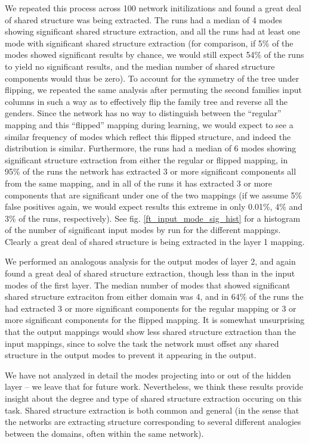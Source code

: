\documentclass[10pt,letterpaper]{article}
\begin{document}
We repeated this process across 100 network initilizations and found a great deal of shared structure was being extracted. The runs had a median of 4 modes showing significant shared structure extraction, and all the runs had at least one mode with significant shared structure extraction (for comparison, if 5\% of the modes showed significant results by chance, we would still expect 54\% of the runs to yield no significant results, and the median number of shared structure components would thus be zero). To account for the symmetry of the tree under flipping, we repeated the same analysis after permuting the second families input columns in such a way as to effectively flip the family tree and reverse all the genders. Since the network has no way to distinguish between the ``regular'' mapping and this ``flipped'' mapping during learning, we would expect to see a similar frequency of modes which reflect this flipped structure, and indeed the distribution is similar. Furthermore, the runs had a median of 6 modes showing significant structure extraction from either the regular or flipped mapping, in 95\% of the runs the network has extracted 3 or more significant components all from the same mapping, and in all of the runs it has extracted 3 or more components that are significant under one of the two mappings (if we assume 5\% false positives again, we would expect results this extreme in only 0.01\%, 4\% and 3\% of the runs, respectively). See fig. \ref{ft_input_mode_sig_hist} for a histogram of the number of significant input modes by run for the different mappings. Clearly a great deal of shared structure is being extracted in the layer 1 mapping. \par
We performed an analogous analysis for the output modes of layer 2, and again found a great deal of shared structure extraction, though less than in the input modes of the first layer. The median number of modes that showed significant shared structure extraciton from either domain was 4, and in 64\% of the runs the had extracted 3 or more significant components for the regular mapping or 3 or more significant components for the flipped mapping. It is somewhat unsurprising that the output mappings would show less shared structure extraction than the input mappings, since to solve the task the network must offset any shared structure in the output modes to prevent it appearing in the output. \par  
We have not analyzed in detail the modes projecting into or out of the hidden layer -- we leave that for future work. Nevertheless, we think these results provide insight about the degree and type of shared structure extraction occuring on this task. Shared structure extraction is both common and general (in the sense that the networks are extracting structure corresponding to several different analogies between the domains, often within the same network).
\end{document}

